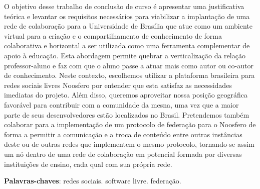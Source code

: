 \begin{resumo}
O objetivo desse trabalho de conclusão de curso é apresentar uma justificativa
teórica e levantar os requisitos necessários para viabilizar a implantação
de uma rede de colaboração para a Universidade de Brasília que atue como um
ambiente virtual para a criação e o compartilhamento de conhecimento de forma
colaborativa e horizontal a ser utilizada como uma ferramenta complementar de
apoio à educação.  
%
Esta abordagem permite quebrar a verticalização da relação professor-aluno e
faz com que o aluno passe a atuar mais como autor ou co-autor de conhecimento. 
%
Neste contexto, escolhemos utilizar a plataforma
brasileira para redes sociais livres Noosfero por entender que esta satisfaz as
necessidades imediatas do projeto. Além disso, queremos aproveitar nossa
posição geográfica favorável para contribuir com a comunidade da mesna, uma vez
que a maior parte de seus desenvolvedores estão localizados no Brasil.
%
Pretendemos também colaborar para a implementação de um protocolo de federação
para o Noosfero de forma a permitir a comunicação e a troca de conteúdo entre
outras instâncias deste ou de outras redes que implementem o mesmo protocolo,
tornando-se assim um nó dentro de uma rede de colaboração em potencial 
formada por diversas instituições de ensino, cada qual com sua própria rede.

 \vspace{\onelineskip}
    
 \noindent
 \textbf{Palavras-chaves}: redes sociais. software livre. federação.
\end{resumo}

